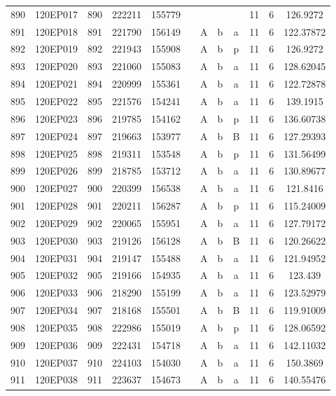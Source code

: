 \begin{tabular}{|*{12}{c|}}
890 & 120EP017 & 890 & 222211 & 155779 &  &  &  &  & 11 & 6 & 126.9272 \\ 
891 & 120EP018 & 891 & 221790 & 156149 &  & A & b & a & 11 & 6 & 122.37872 \\ 
892 & 120EP019 & 892 & 221943 & 155908 &  & A & b & p & 11 & 6 & 126.9272 \\ 
893 & 120EP020 & 893 & 221060 & 155083 &  & A & b & a & 11 & 6 & 128.62045 \\ 
894 & 120EP021 & 894 & 220999 & 155361 &  & A & b & a & 11 & 6 & 122.72878 \\ 
895 & 120EP022 & 895 & 221576 & 154241 &  & A & b & a & 11 & 6 & 139.1915 \\ 
896 & 120EP023 & 896 & 219785 & 154162 &  & A & b & p & 11 & 6 & 136.60738 \\ 
897 & 120EP024 & 897 & 219663 & 153977 &  & A & b & B & 11 & 6 & 127.29393 \\ 
898 & 120EP025 & 898 & 219311 & 153548 &  & A & b & p & 11 & 6 & 131.56499 \\ 
899 & 120EP026 & 899 & 218785 & 153712 &  & A & b & a & 11 & 6 & 130.89677 \\ 
900 & 120EP027 & 900 & 220399 & 156538 &  & A & b & a & 11 & 6 & 121.8416 \\ 
901 & 120EP028 & 901 & 220211 & 156287 &  & A & b & p & 11 & 6 & 115.24009 \\ 
902 & 120EP029 & 902 & 220065 & 155951 &  & A & b & a & 11 & 6 & 127.79172 \\ 
903 & 120EP030 & 903 & 219126 & 156128 &  & A & b & B & 11 & 6 & 120.26622 \\ 
904 & 120EP031 & 904 & 219147 & 155488 &  & A & b & a & 11 & 6 & 121.94952 \\ 
905 & 120EP032 & 905 & 219166 & 154935 &  & A & b & a & 11 & 6 & 123.439 \\ 
906 & 120EP033 & 906 & 218290 & 155199 &  & A & b & a & 11 & 6 & 123.52979 \\ 
907 & 120EP034 & 907 & 218168 & 155501 &  & A & b & B & 11 & 6 & 119.91009 \\ 
908 & 120EP035 & 908 & 222986 & 155019 &  & A & b & p & 11 & 6 & 128.06592 \\ 
909 & 120EP036 & 909 & 222431 & 154718 &  & A & b & a & 11 & 6 & 142.11032 \\ 
910 & 120EP037 & 910 & 224103 & 154030 &  & A & b & a & 11 & 6 & 150.3869 \\ 
911 & 120EP038 & 911 & 223637 & 154673 &  & A & b & a & 11 & 6 & 140.55476 \\ 

\end{tabular}
